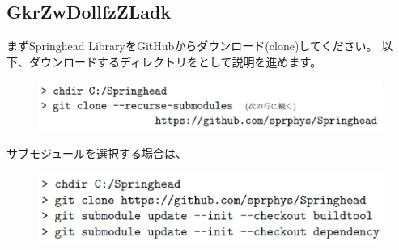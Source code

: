 \subsection{GkrZwDollfzZLadk}
\label{subsec:Download}

\noindent
\KLUDGE まずSpringhead Library\KLUDGE をGitHub\KLUDGE からダウンロード(clone)\KLUDGE してください。
\KLUDGE 以下、ダウンロードするディレクトリを\SprTop{}\KLUDGE として説明を進めます。

\medskip
\ifLwarp
	\begin{figure}[h]
	    \begin{center}
	    \includegraphics[width=\textwidth]{fig/command-2-1-a.eps}
	    \end{center}
	    \label{fig:DownloadTree}
	\end{figure}
\else
\begin{narrow}[15pt]
\end{narrow}
\fi
\medskip
\KLUDGE サブモジュールを選択する場合は、
\ifLwarp
	\begin{figure}[h]
	    \begin{center}
	    \includegraphics[width=\textwidth]{fig/command-2-1-b.eps}
	    \end{center}
	    \label{fig:DownloadTree}
	\end{figure}
\else
\begin{narrow}[15pt]
\end{narrow}
